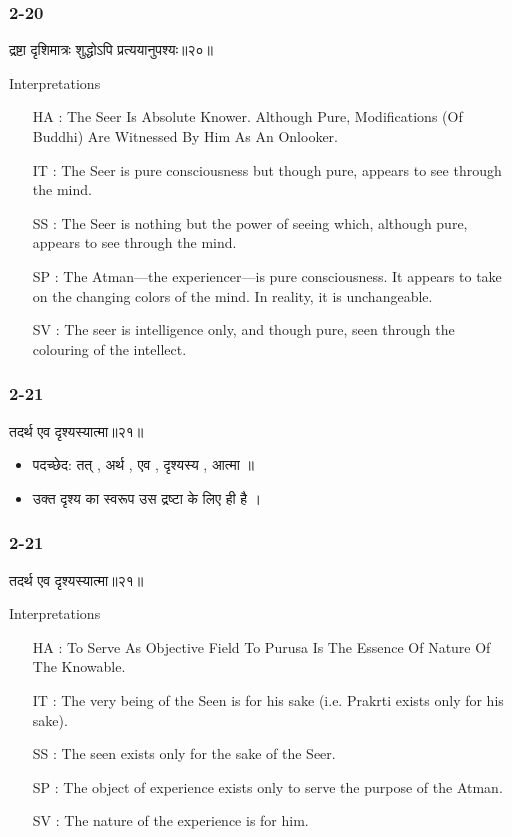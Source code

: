 \begin{frame}[fragile]\frametitle{2-20}
\begin{sanskrit}
द्रष्टा दृशिमात्रः शुद्धोऽपि प्रत्ययानुपश्यः॥२०॥
\end{sanskrit}

Interpretations
\begin{itemize}
\item [HA]: The Seer Is Absolute Knower. Although Pure, Modifications (Of Buddhi) Are Witnessed By Him As An Onlooker.
\item [IT]: The Seer is pure consciousness but though pure, appears to see through the mind.
\item [SS]: The Seer is nothing but the power of seeing which, although pure, appears to see through the mind.
\item [SP]: The Atman—the experiencer—is pure consciousness. It appears to take on the changing colors of the mind. In reality, it is unchangeable.
\item [SV]: The seer is intelligence only, and though pure, seen through the colouring of the intellect. 
\end{itemize}
	
\end{frame}

\begin{frame}[fragile]\frametitle{2-21}
\begin{sanskrit}
तदर्थ एव दृश्यस्यात्मा॥२१॥
\end{sanskrit}

\begin{itemize}
\item पदच्छेद: तत् , अर्थ , एव , दृश्यस्य , आत्मा ॥
\item उक्त दृश्य का स्वरूप उस द्रष्टा के लिए ही है ।
\end{itemize}
	
\end{frame}

\begin{frame}[fragile]\frametitle{2-21}
\begin{sanskrit}
तदर्थ एव दृश्यस्यात्मा॥२१॥
\end{sanskrit}

Interpretations
\begin{itemize}
\item [HA]: To Serve As Objective Field To Purusa Is The Essence Of Nature Of The Knowable.
\item [IT]: The very being of the Seen is for his sake (i.e. Prakrti exists only for his sake).
\item [SS]: The seen exists only for the sake of the Seer.
\item [SP]: The object of experience exists only to serve the purpose of the Atman.
\item [SV]: The nature of the experience is for him. 
\end{itemize}
	
\end{frame}

